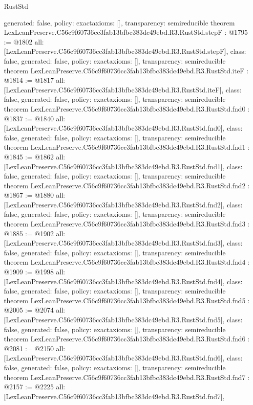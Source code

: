 \begin{lexlean}{RustStd}
\begin{coremodule}
{  generated: false,
  policy: exact{axioms: []},
  transparency: semireducible
}
theorem LexLeanPreserve.C56c9f60736cc3fab13bfbc383dc49ebd.R3.RustStd.stepF : @1795 := @1802 {
  all: [LexLeanPreserve.C56c9f60736cc3fab13bfbc383dc49ebd.R3.RustStd.stepF],
  class: false,
  generated: false,
  policy: exact{axioms: []},
  transparency: semireducible
}
theorem LexLeanPreserve.C56c9f60736cc3fab13bfbc383dc49ebd.R3.RustStd.iteF : @1814 := @1817 {
  all: [LexLeanPreserve.C56c9f60736cc3fab13bfbc383dc49ebd.R3.RustStd.iteF],
  class: false,
  generated: false,
  policy: exact{axioms: []},
  transparency: semireducible
}
theorem LexLeanPreserve.C56c9f60736cc3fab13bfbc383dc49ebd.R3.RustStd.fnd0 : @1837 := @1840 {
  all: [LexLeanPreserve.C56c9f60736cc3fab13bfbc383dc49ebd.R3.RustStd.fnd0],
  class: false,
  generated: false,
  policy: exact{axioms: []},
  transparency: semireducible
}
theorem LexLeanPreserve.C56c9f60736cc3fab13bfbc383dc49ebd.R3.RustStd.fnd1 : @1845 := @1862 {
  all: [LexLeanPreserve.C56c9f60736cc3fab13bfbc383dc49ebd.R3.RustStd.fnd1],
  class: false,
  generated: false,
  policy: exact{axioms: []},
  transparency: semireducible
}
theorem LexLeanPreserve.C56c9f60736cc3fab13bfbc383dc49ebd.R3.RustStd.fnd2 : @1867 := @1880 {
  all: [LexLeanPreserve.C56c9f60736cc3fab13bfbc383dc49ebd.R3.RustStd.fnd2],
  class: false,
  generated: false,
  policy: exact{axioms: []},
  transparency: semireducible
}
theorem LexLeanPreserve.C56c9f60736cc3fab13bfbc383dc49ebd.R3.RustStd.fnd3 : @1885 := @1902 {
  all: [LexLeanPreserve.C56c9f60736cc3fab13bfbc383dc49ebd.R3.RustStd.fnd3],
  class: false,
  generated: false,
  policy: exact{axioms: []},
  transparency: semireducible
}
theorem LexLeanPreserve.C56c9f60736cc3fab13bfbc383dc49ebd.R3.RustStd.fnd4 : @1909 := @1998 {
  all: [LexLeanPreserve.C56c9f60736cc3fab13bfbc383dc49ebd.R3.RustStd.fnd4],
  class: false,
  generated: false,
  policy: exact{axioms: []},
  transparency: semireducible
}
theorem LexLeanPreserve.C56c9f60736cc3fab13bfbc383dc49ebd.R3.RustStd.fnd5 : @2005 := @2074 {
  all: [LexLeanPreserve.C56c9f60736cc3fab13bfbc383dc49ebd.R3.RustStd.fnd5],
  class: false,
  generated: false,
  policy: exact{axioms: []},
  transparency: semireducible
}
theorem LexLeanPreserve.C56c9f60736cc3fab13bfbc383dc49ebd.R3.RustStd.fnd6 : @2081 := @2150 {
  all: [LexLeanPreserve.C56c9f60736cc3fab13bfbc383dc49ebd.R3.RustStd.fnd6],
  class: false,
  generated: false,
  policy: exact{axioms: []},
  transparency: semireducible
}
theorem LexLeanPreserve.C56c9f60736cc3fab13bfbc383dc49ebd.R3.RustStd.fnd7 : @2157 := @2225 {
  all: [LexLeanPreserve.C56c9f60736cc3fab13bfbc383dc49ebd.R3.RustStd.fnd7],
}
\end{coremodule}
\end{lexlean}
